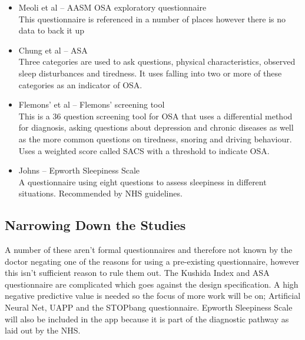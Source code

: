 \begin{itemize}
\item Meoli et al – AASM OSA exploratory questionnaire\\
This questionnaire is referenced in a number of places however there is no data to back it up
\item Chung et al – ASA\\
Three categories are used to ask questions, physical characteristics, observed sleep disturbances and tiredness. It uses falling into two or more of these categories as an indicator of OSA. 
\item Flemons’ et al – Flemons’ screening tool\\
This is a 36 question screening tool for OSA that uses a differential method for diagnosis, asking questions about depression and chronic diseases as well as the more common questions on tiredness, snoring and driving behaviour. Uses a weighted score called SACS with a threshold to indicate OSA. 
\item Johns – Epworth Sleepiness Scale\\
A questionnaire using eight questions to assess sleepiness in different situations. Recommended by NHS guidelines. 
\end{itemize}

\subsection{Narrowing Down the Studies}
A number of these aren’t formal questionnaires and therefore not known by the doctor negating one of the reasons for using a pre-existing questionnaire, however this isn’t sufficient reason to rule them out. The Kushida Index and ASA questionnaire are complicated which goes against the design specification. A high negative predictive value is needed so the focus of more work will be on; Artificial Neural Net, UAPP and the STOPbang questionnaire. Epworth Sleepiness Scale will also be included in the app because it is part of the diagnostic pathway as laid out by the NHS.
